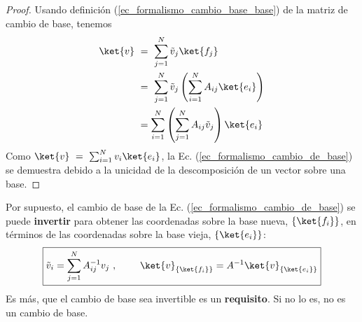 \documentclass[a4paper,11pt]{book} %
\numberwithin{equation}{chapter}
\def\lp{\left(}
\def\rp{\right)}
\begin{document}
	\begin{proof}
	Usando definición (\ref{ec_formalismo_cambio_base_base}) de la matriz de cambio de base, tenemos
	\begin{align*}
	\ket{v} ~&= ~ \sum_{j=1}^N \tilde{v}_j \ket{f_j} \\
	& = ~ \sum_{j=1}^N \tilde{v}_j \lp \sum_{i=1}^N A_{ i j} \ket{e_i} \rp \\
	& =   \sum_{i=1}^N \lp  \sum_{j=1}^N A_{ i j} \tilde{v}_j \rp \ket{e_i} 
	\end{align*}
	Como $\ket{v} ~=~ \sum_{i=1}^N v_i \ket{e_i}$, la Ec. (\ref{ec_formalismo_cambio_de_base}) se demuestra debido a la unicidad de la descomposición de un vector sobre una base.
	\end{proof}
	
	Por supuesto, el cambio de base de la Ec. (\ref{ec_formalismo_cambio_de_base}) se puede \textbf{invertir} para 
	obtener las coordenadas sobre la base nueva, $\{\ket{f_i}\}$, en términos de las coordenadas sobre la base vieja,  $\{\ket{e_i}\}$:
	\begin{equation} \label{ec_formalismo_cambio_de_base_inv}
	\boxed{\tilde{v}_i = \sum_{j=1}^N A^{-1}_{ij} v_j ~, ~~~~~~~ 
	\ket{v}_{\{\ket{f_i}\}} = A^{-1} \ket{v}_{\{\ket{e_i}\}}}
	\end{equation}
	Es más, que el cambio de base sea invertible es un \textbf{requisito}. Si no lo es, no es un cambio de base.
	
\end{document}
